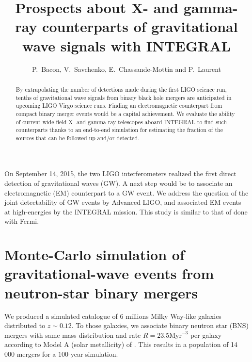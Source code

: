 \documentclass[11pt]{article}
\begin{document}
\title{Prospects about X- and gamma-ray counterparts of gravitational wave signals with INTEGRAL}
\author{P.~Bacon, V.~Savchenko, E.~Chassande-Mottin and P.~Laurent}


\begin{abstract}
  By extrapolating the number of detections made during the first LIGO science
  run, tenths of gravitational wave signals from binary black hole mergers are
  anticipated in upcoming LIGO Virgo science runs. Finding an electromagnetic
  counterpart from compact binary merger events would be a capital achievement.
  We evaluate the ability of current wide-field X- and gamma-ray telescopes
  aboard INTEGRAL to find such counterparts thanks to an end-to-end simulation
  for estimating the fraction of the sources that can be followed up and/or
  detected.
\end{abstract}

 
On September 14, 2015, the two LIGO interferometers realized the first direct detection of
gravitational waves (GW). A next step would be to associate an electromagnetic (EM)
counterpart to a GW event. We address the question of the joint detectability 
of GW events by Advanced LIGO, and associated EM events at high-energies by the 
INTEGRAL mission. This study is similar to that of \citep{2016arXiv160606124P} done with Fermi.

\section*{Monte-Carlo simulation of gravitational-wave events from neutron-star binary mergers}

We produced a simulated catalogue of 6 millions Milky Way-like galaxies
distributed to $z\sim 0.12$. To those galaxies, we associate binary neutron star
(BNS) mergers with same mass distribution and rate $R=23.5 \mathrm{Myr}^{-3}$ per galaxy
according to Model A (solar metallicity) of
\citep{2012ApJ...759...52D}. This results in a population of 14\,000
mergers for a $100$-year simulation.
\end{document}
